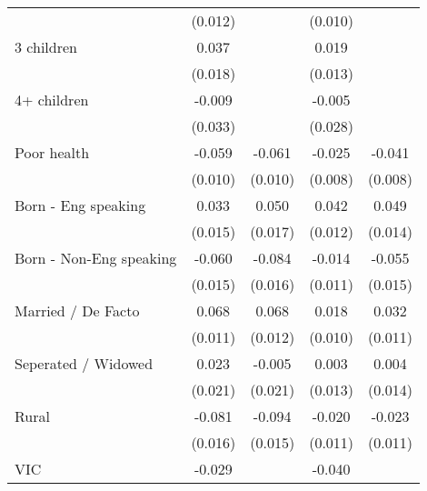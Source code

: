 {\begin{tabular}{l*{4}{c}}
                    &     (0.012)         &                     &     (0.010)         &                     \\
3 children          &       0.037\sym{**} &                     &       0.019         &                     \\
                    &     (0.018)         &                     &     (0.013)         &                     \\
4+ children         &      -0.009         &                     &      -0.005         &                     \\
                    &     (0.033)         &                     &     (0.028)         &                     \\
Poor health         &      -0.059\sym{***}&      -0.061\sym{***}&      -0.025\sym{***}&      -0.041\sym{***}\\
                    &     (0.010)         &     (0.010)         &     (0.008)         &     (0.008)         \\
Born - Eng speaking &       0.033\sym{**} &       0.050\sym{***}&       0.042\sym{***}&       0.049\sym{***}\\
                    &     (0.015)         &     (0.017)         &     (0.012)         &     (0.014)         \\
Born - Non-Eng speaking&      -0.060\sym{***}&      -0.084\sym{***}&      -0.014         &      -0.055\sym{***}\\
                    &     (0.015)         &     (0.016)         &     (0.011)         &     (0.015)         \\
Married / De Facto  &       0.068\sym{***}&       0.068\sym{***}&       0.018\sym{*}  &       0.032\sym{***}\\
                    &     (0.011)         &     (0.012)         &     (0.010)         &     (0.011)         \\
Seperated / Widowed &       0.023         &      -0.005         &       0.003         &       0.004         \\
                    &     (0.021)         &     (0.021)         &     (0.013)         &     (0.014)         \\
Rural               &      -0.081\sym{***}&      -0.094\sym{***}&      -0.020\sym{*}  &      -0.023\sym{**} \\
                    &     (0.016)         &     (0.015)         &     (0.011)         &     (0.011)         \\
VIC                 &      -0.029\sym{**} &                     &      -0.040\sym{***}&                     \\

\end{tabular}}

